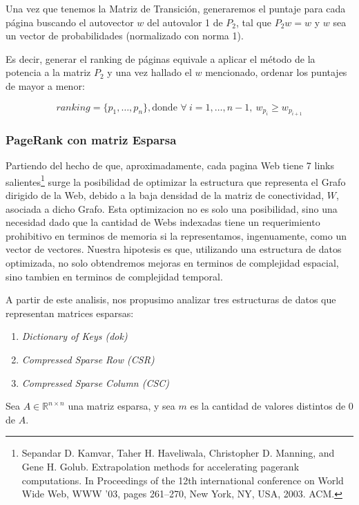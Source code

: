 Una vez que tenemos la Matriz de Transición, generaremos el puntaje para cada página
 buscando el autovector $w$ del autovalor 1 de $P_{2}$, tal que $P_{2}w = w$ y
$w$ sea un vector de probabilidades (normalizado con norma 1).

Es decir, generar el ranking de páginas equivale a aplicar el método de la potencia
a la matriz $P_{2}$ y una vez hallado el $w$ mencionado, ordenar los puntajes de
mayor a menor:

\begin{equation} \label{eq:ranking_page_rank}
    ranking = \{ p_1, \dots, p_n \}, \text{donde } \forall\ i=1,\dots,n-1,\ w_{p_{i}} \geq w_{p_{i+1}}
\end{equation}

\subsubsection{PageRank con matriz Esparsa}

Partiendo del hecho de que, aproximadamente, cada pagina Web tiene 7 links salientes\footnote{Sepandar D. Kamvar, Taher H. Haveliwala, Christopher D. Manning, and Gene H. Golub.
Extrapolation methods for accelerating pagerank computations. In Proceedings of the 12th
international conference on World Wide Web, WWW ’03, pages 261–270, New York, NY,
USA, 2003. ACM.} surge la posibilidad de optimizar la estructura que representa el Grafo dirigido de la Web, debido a la baja densidad de la matriz de conectividad, $W$, asociada a dicho Grafo.
Esta optimizacion no es solo una posibilidad, sino una necesidad dado que la cantidad de Webs indexadas tiene un requerimiento prohibitivo en terminos de memoria si la representamos, ingenuamente, como un vector de vectores.
Nuestra hipotesis es que, utilizando una estructura de datos optimizada, no solo obtendremos mejoras en terminos de complejidad espacial, sino tambien en terminos de complejidad temporal.

A partir de este analisis, nos propusimo analizar tres estructuras de datos que representan matrices esparsas:
\begin{enumerate}
  \item \textit{Dictionary of Keys (dok)}
  \item \textit{Compressed Sparse Row (CSR)}
  \item \textit{Compressed Sparse Column (CSC)}
\end{enumerate}

Sea $A \in \mathbb{R}^{n \times n}$ una matriz esparsa, y sea $m$ es la cantidad de valores distintos de 0 de $A$.
